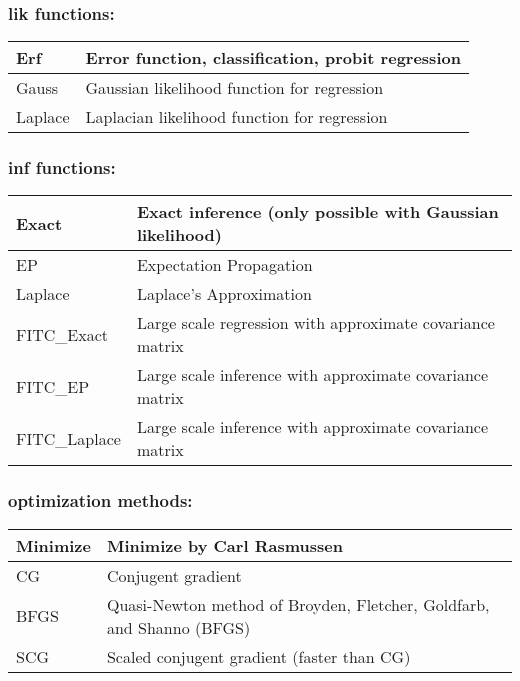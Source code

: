 \documentclass[letterpaper,10pt,english]{sphinxmanual}
\begin{document}
\subsubsection{lik functions:}
\label{functionality:lik-functions}
\begin{tabulary}{\linewidth}{|L|L|}
\hline

Erf
 & 
Error function, classification, probit regression
\\\hline

Gauss
 & 
Gaussian likelihood function for regression
\\\hline

Laplace
 & 
Laplacian likelihood function for regression
\\\hline
\end{tabulary}



\subsubsection{inf functions:}
\label{functionality:inf-functions}
\begin{tabulary}{\linewidth}{|L|L|}
\hline

Exact
 & 
Exact inference (only possible with Gaussian likelihood)
\\\hline

EP
 & 
Expectation Propagation
\\\hline

Laplace
 & 
Laplace's Approximation
\\\hline

FITC\_Exact
 & 
Large scale regression with approximate covariance matrix
\\\hline

FITC\_EP
 & 
Large scale inference  with approximate covariance matrix
\\\hline

FITC\_Laplace
 & 
Large scale inference  with approximate covariance matrix
\\\hline
\end{tabulary}



\subsubsection{optimization methods:}
\label{functionality:optimization-methods}
\begin{tabulary}{\linewidth}{|L|L|}
\hline

Minimize
 & 
Minimize by Carl Rasmussen
\\\hline

CG
 & 
Conjugent gradient
\\\hline

BFGS
 & 
Quasi-Newton method of Broyden, Fletcher, Goldfarb, and Shanno (BFGS)
\\\hline

SCG
 & 
Scaled conjugent gradient (faster than CG)
\\\hline
\end{tabulary}
\end{document}
